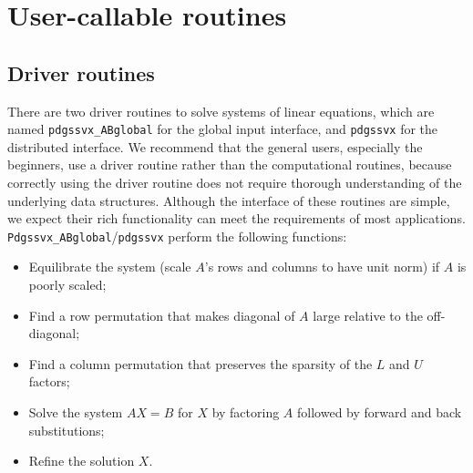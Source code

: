 \section{User-callable routines}

\subsection{Driver routines}
\label{sec:drivers}
There are two driver routines to solve systems of linear equations,
which are named {\tt pdgssvx\_ABglobal} for the global input interface,
and {\tt pdgssvx} for the distributed interface.
We recommend that the general users, especially the beginners, 
use a driver routine rather than the computational
routines, because correctly using the driver routine does not require
thorough understanding of the underlying data structures.
Although the interface of these routines are simple, we expect their rich 
functionality can meet the requirements of most applications.
{\tt Pdgssvx\_ABglobal}/{\tt pdgssvx} perform the following functions:
\begin{itemize}
\item Equilibrate the system (scale $A$'s rows and columns to
	have unit norm) if $A$ is poorly scaled;
\item Find a row permutation that makes diagonal of $A$ large
	relative to the off-diagonal;
\item Find a column permutation that preserves the sparsity of
	the $L$ and $U$ factors;
\item Solve the system $AX=B$ for $X$ by factoring $A$
	followed by forward and back substitutions;
\item Refine the solution $X$.
\end{itemize}


